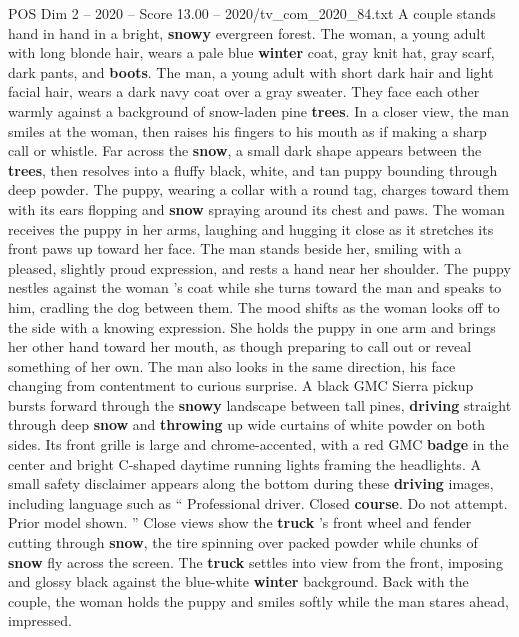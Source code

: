\begin{textsample}{POS Dim 2 – 2020 – Score 13.00 – 2020/tv\_com\_2020\_84.txt}  \label{ex:f2_pos_050}
A couple stands hand in hand in a bright, \textbf{snowy} evergreen forest.
The woman, a young adult with long blonde hair, wears a pale blue \textbf{winter} coat, gray knit hat, gray scarf, dark pants, and \textbf{boots}.
The man, a young adult with short dark hair and light facial hair, wears a dark navy coat over a gray sweater.
They face each other warmly against a background of snow-laden pine \textbf{trees}.
In a closer view, the man smiles at the woman, then raises his fingers to his mouth as if making a sharp call or whistle.
Far across the \textbf{snow}, a small dark shape appears between the \textbf{trees}, then resolves into a fluffy black, white, and tan puppy bounding through deep powder.
The puppy, wearing a collar with a round tag, charges toward them with its ears flopping and \textbf{snow} spraying around its chest and paws.
The woman receives the puppy in her arms, laughing and hugging it close as it stretches its front paws up toward her face.
The man stands beside her, smiling with a pleased, slightly proud expression, and rests a hand near her shoulder.
The puppy nestles against the woman ’s coat while she turns toward the man and speaks to him, cradling the dog between them.
The mood shifts as the woman looks off to the side with a knowing expression.
She holds the puppy in one arm and brings her other hand toward her mouth, as though preparing to call out or reveal something of her own.
The man also looks in the same direction, his face changing from contentment to curious surprise.
A black GMC Sierra pickup bursts forward through the \textbf{snowy} landscape between tall pines, \textbf{driving} straight through deep \textbf{snow} and \textbf{throwing} up wide curtains of white powder on both sides.
Its front grille is large and chrome-accented, with a red GMC \textbf{badge} in the center and bright C-shaped daytime running lights framing the headlights.
A small safety disclaimer appears along the bottom during these \textbf{driving} images, including language such as “ Professional driver.
Closed \textbf{course}.
Do not attempt.
Prior model shown. ” Close views show the \textbf{truck} ’s front wheel and fender cutting through \textbf{snow}, the tire spinning over packed powder while chunks of \textbf{snow} fly across the screen.
The \textbf{truck} settles into view from the front, imposing and glossy black against the blue-white \textbf{winter} background.
Back with the couple, the woman holds the puppy and smiles softly while the man stares ahead, impressed.

\end{textsample}
